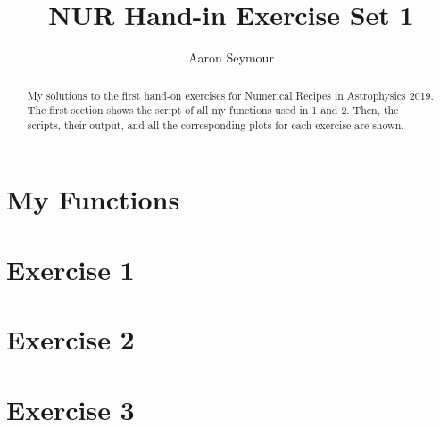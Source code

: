 \documentclass[a4paper,10pt]{article}
\title{NUR Hand-in Exercise Set 1}
\author{Aaron Seymour}
\begin{document}
\maketitle

\begin{abstract}
 My solutions to the first hand-on exercises for Numerical Recipes in Astrophysics 2019. The first section shows the script of all my functions used in 1 and 2. Then, the scripts, their output, and all the corresponding plots for each exercise are shown.
\end{abstract}


\section{My Functions}


\newpage

\section{Exercise 1}


\newpage

\section{Exercise 2}


\newpage

\section{Exercise 3}

\end{document}
